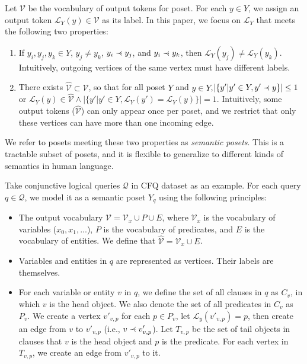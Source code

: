 \documentclass{article}
\newcommand{\precdot}{\prec\mathrel{\mkern-5mu}\mathrel{\cdot}}
\begin{document}
Let $\mathcal{V}$ be the vocabulary of output tokens for poset.
For each $y\in Y$, we assign an output token $\mathcal{L}_Y(y) \in \mathcal{V}$ as its label.
In this paper, we focus on $\mathcal{L}_Y$ that meets the following two properties:

\begin{enumerate}
\item If $y_i, y_j, y_k \in Y$, $y_j \neq y_k$, $y_i \precdot y_j$, and $y_i \precdot y_k$, then $\mathcal{L}_Y(y_j) \neq \mathcal{L}_Y(y_k)$.
Intuitively, outgoing vertices of the same vertex must have different labels.
\item There exists $\hat{\mathcal{V}}\subset \mathcal{V}$, so that for all poset $Y$ and $y\in Y$,$|\{y'|y'\in Y, y'\precdot y\}| \leq 1$ or $\mathcal{L}_Y(y)\in \hat{\mathcal{V}}\wedge |\{y'|y'\in Y, \mathcal{L}_Y(y')=\mathcal{L}_Y(y)\}| = 1$.
Intuitively, some output tokens ($\hat{\mathcal{V}}$) can only appear once per poset, and we restrict that only these vertices can have more than one incoming edge.
\end{enumerate}

We refer to posets meeting these two properties as \emph{semantic posets}.
This is a tractable subset of posets, and it is flexible to generalize to different kinds of semantics in human language.

Take conjunctive logical queries $\mathcal{Q}$ in CFQ dataset as an example.
For each query $q\in \mathcal{Q}$, we model it as a semantic poset $Y_q$ using the following principles:

\begin{itemize}
\item The output vocabulary $\mathcal{V} = \mathcal{V}_x \cup P \cup E$, where $\mathcal{V}_x$ is the vocabulary of variables ($x_0, x_1, ...$), $P$ is the vocabulary of predicates, and $E$ is the vocabulary of entities.
We define that $\hat{\mathcal{V}} = \mathcal{V}_x \cup E$.
\item Variables and entities in $q$ are represented as vertices. Their labels are themselves.
\item For each variable or entity $v$ in $q$, we define the set of all clauses in $q$ as $C_v$, in which $v$ is the head object.
We also denote the set of all predicates in $C_v$ as $P_v$.
We create a vertex $v'_{v,p}$ for each $p\in P_v$, let $\mathcal{L}_y(v'_{v,p})=p$, then create an edge from $v$ to $v'_{v,p}$ (i.e., $v \precdot v'_{v,p}$).
Let $T_{v,p}$ be the set of tail objects in clauses that $v$ is the head object and $p$ is the predicate.
For each vertex in $T_{v,p}$, we create an edge from $v'_{v,p}$ to it.
\end{itemize}
\end{document}
